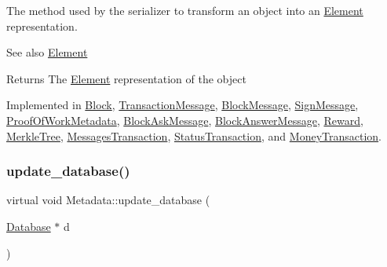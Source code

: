 The method used by the serializer to transform an object into an \mbox{\hyperlink{classElement}{Element}} representation. \begin{DoxySeeAlso}{See also}
\mbox{\hyperlink{classElement}{Element}}
\end{DoxySeeAlso}
\begin{DoxyReturn}{Returns}
The \mbox{\hyperlink{classElement}{Element}} representation of the object 
\end{DoxyReturn}


Implemented in \mbox{\hyperlink{classBlock_aa289363a40f0d3ba88720ad0bc71f34f}{Block}}, \mbox{\hyperlink{classTransactionMessage_ae20e7d6a7b5811bb56a32ec6af59b8e2}{Transaction\+Message}}, \mbox{\hyperlink{classBlockMessage_ab47afd5cfb7d6d5c544d8def5d0f9737}{Block\+Message}}, \mbox{\hyperlink{classSignMessage_aee897c4bf78df966b8cca95e589566e4}{Sign\+Message}}, \mbox{\hyperlink{classProofOfWorkMetadata_a2aab4c26afb3a85a712cc065028274d9}{Proof\+Of\+Work\+Metadata}}, \mbox{\hyperlink{classBlockAskMessage_a0bc20076f19423855ab5772003fb65f6}{Block\+Ask\+Message}}, \mbox{\hyperlink{classBlockAnswerMessage_ac7f35ec9f7f2fbcd726628c2a984518b}{Block\+Answer\+Message}}, \mbox{\hyperlink{classReward_a0ecd536148463880f9980fe415b6eb1d}{Reward}}, \mbox{\hyperlink{classMerkleTree_a4e72819c6cbc49ed8ce092f464711a5f}{Merkle\+Tree}}, \mbox{\hyperlink{classMessagesTransaction_a0ef8ec080a2698a02ad8b1b95d243720}{Messages\+Transaction}}, \mbox{\hyperlink{classStatusTransaction_aed42f2d61f2d50ec07bb6b35473f61f2}{Status\+Transaction}}, and \mbox{\hyperlink{classMoneyTransaction_a84adc847266467965014cb04acd48bea}{Money\+Transaction}}.

\mbox{\label{classMetadata_a501ab1977aac6a75f92309284e17de30}} 
\subsubsection{\texorpdfstring{update\+\_\+database()}{update\_database()}}
{\footnotesize\ttfamily virtual void Metadata\+::update\+\_\+database (\begin{DoxyParamCaption}\item[{\mbox{\hyperlink{classDatabase}{Database}} $\ast$}]{d }\end{DoxyParamCaption})\hspace{0.3cm}{\ttfamily [pure virtual]}}

